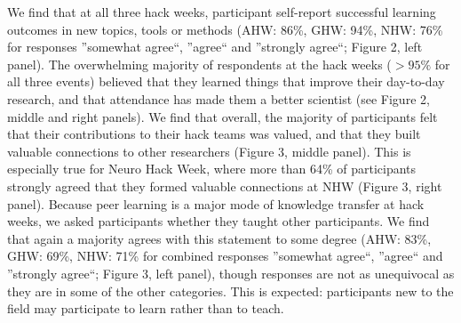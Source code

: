 We find that at all three hack weeks, participant self-report successful learning outcomes in new topics, tools or methods (AHW: 86\%, GHW: 94\%, NHW: 76\% for responses ''somewhat agree``, ''agree`` and ''strongly agree``; Figure 2, left panel).
The overwhelming majority of respondents at the hack weeks ($>95\%$ for all three events) believed that they learned things that improve their day-to-day research, and that attendance has made them a better scientist (see Figure 2, middle and right panels).
We find that overall, the majority of participants felt that their contributions to their hack teams was valued, and that they built valuable connections to other researchers (Figure 3, middle panel).
This is especially true for Neuro Hack Week, where more than 64\% of participants strongly agreed that they formed valuable connections at NHW (Figure 3, right panel).
Because peer learning is a major mode of knowledge transfer at hack weeks, we asked participants whether they taught other participants.
We find that again a majority agrees with this statement to some degree (AHW: 83\%, GHW: 69\%, NHW: 71\% for combined responses ''somewhat agree``, ''agree`` and ''strongly agree``; Figure 3, left panel), though responses are not as unequivocal as they are in some of the other categories.
This is expected: participants new to the field may participate to learn rather than to teach.

